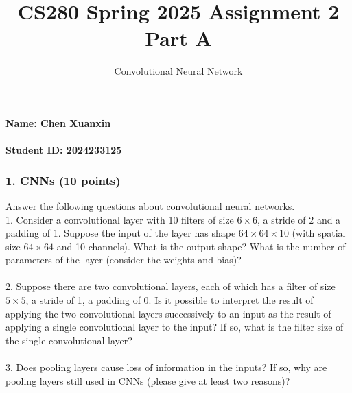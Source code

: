\documentclass[12pt]{article}%
\begin{document}
\title{CS280 Spring 2025 Assignment 2 \\ Part A}
\author{Convolutional Neural Network}
\maketitle

\paragraph{Name: Chen Xuanxin}

\paragraph{Student ID: 2024233125}

\newpage 

\subsubsection*{\textbf{1. CNNs (10 points)}}
Answer the following questions about convolutional neural networks.
\vspace{0.5em}
\\
1. Consider a convolutional layer with 10 filters of size $6 \times 6$, a stride of 2 and a padding of 1. Suppose the input of the layer has shape $64 \times 64 \times 10$ (with spatial size $64 \times 64$ and 10 channels). What is the output shape? What is the number of parameters of the layer (consider the weights and bias)?
\\\\
2. Suppose there are two convolutional layers, each of which has a filter of size $5 \times 5$, a stride of 1, a padding of 0. Is it possible to interpret the result of applying the two convolutional layers successively to an input as the result of applying a single convolutional layer to the input? If so, what is the filter size of the single convolutional layer?   
\\\\
3. Does pooling layers cause loss of information in the inputs? If so, why are pooling layers still used in CNNs (please give at least two reasons)?

\newpage



\newpage
\end{document}

